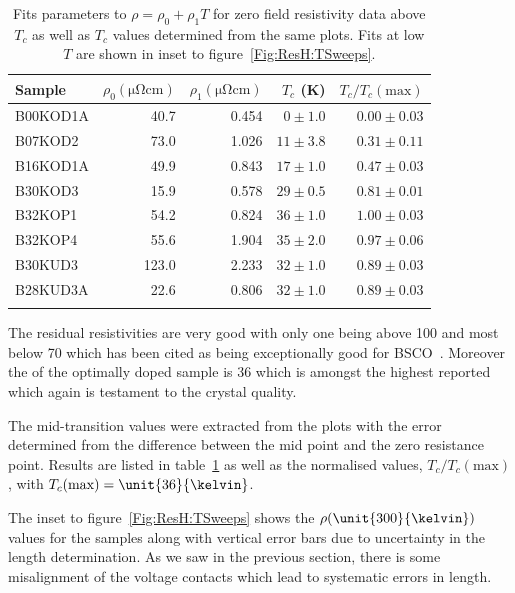 \begin{table}
	\begin{center}
       	\caption{Fits parameters to $\rho = \rho_0 + \rho_1T$ for zero field resistivity data above $T_c$ as well as $T_c$ values determined from the same plots. Fits at low $T$ are shown in inset to figure~\ref{Fig:ResH:TSweeps}.}
		{\small \begin{tabular}[htbp]{lrrrr}
\toprule
Sample		& $\rho_0 (\unit{\micro\ohm\centi\metre})$	& $\rho_1 (\unit{\micro\ohm\centi\metre})$  & $T_c$ (\unit{\kelvin})	& $T_c/T_c(\textrm{max})$	\\
\midrule
B00KOD1A	& 40.7		& 0.454     & $0\pm1.0$	    & $0.00\pm0.03$	\\
B07KOD2		& 73.0		& 1.026     & $11\pm3.8$	& $0.31\pm0.11$	\\
B16KOD1A	& 49.9		& 0.843     & $17\pm1.0$	& $0.47\pm0.03$	\\
B30KOD3		& 15.9		& 0.578     & $29\pm0.5$	& $0.81\pm0.01$	\\
B32KOP1		& 54.2		& 0.824     & $36\pm1.0$	& $1.00\pm0.03$	\\
B32KOP4		& 55.6		& 1.904     & $35\pm2.0$	& $0.97\pm0.06$	\\
B30KUD3		& 123.0		& 2.233     & $32\pm1.0$	& $0.89\pm0.03$ \\
B28KUD3A	& 22.6		& 0.806     & $32\pm1.0$	& $0.89\pm0.03$	\\
\bottomrule
		\label{Table:ResH:TSweepFitsParams}
		\end{tabular} }
	\end{center}
\end{table}
The residual resistivities are very good with only one being above \unit{100}{\micro\ohm\centi\metre} and most below \unit{70}{\micro\ohm\centi\metre} which has been cited as being exceptionally good for \ac{BSCO}~\cite{Ando1999}. Moreover the \Tc of the optimally doped sample is \unit{36}{\kelvin} which is amongst the highest reported~\cite{Ando1999} which again is testament to the crystal quality.

The mid-transition \Tc values were extracted from the plots with the error determined from the difference between the mid point and the zero resistance point. Results are listed in table~\ref{Table:ResH:TSweepFitsParams} as well as the normalised \Tc values, $T_c/T_c(\textrm{max})$, with $T_c(\textrm{max}) = \unit{36}{\kelvin}$.

The inset to figure~\ref{Fig:ResH:TSweeps} shows the $\rho(\unit{300}{\kelvin})$ values for the samples along with vertical error bars due to uncertainty in the length determination. As we saw in the previous section, there is some misalignment of the voltage contacts which lead to systematic errors in length.


